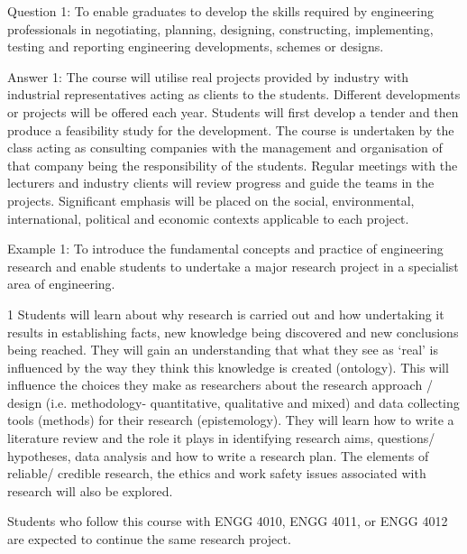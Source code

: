 \begin{question}{Question 1:}
  To enable graduates to develop the skills required by engineering professionals in negotiating, planning, designing, constructing, implementing, testing and reporting engineering developments, schemes or designs.


\end{question}

\begin{answer}{Answer 1:}
The course will utilise real projects provided by industry with industrial representatives acting as clients to the students. Different developments or projects will be offered each year. Students will first develop a tender and then produce a feasibility study for the development. The course is undertaken by the class acting as consulting companies with the management and organisation of that company being the responsibility of the students. Regular meetings with the lecturers and industry clients will review progress and guide the teams in the projects. Significant emphasis will be placed on the social, environmental, international, political and economic contexts applicable to each project.
\end{answer}

\begin{example}{Example 1:}
To introduce the fundamental concepts and practice of engineering research and enable students to undertake a major research project in a specialist area of engineering.
\end{example}

\begin{title1}{1}
  Students will learn about why research is carried out and how undertaking it results in establishing facts, new knowledge being discovered and new conclusions being reached. They will gain an understanding that what they see as ‘real’ is influenced by the way they think this knowledge is created (ontology). This will influence the choices they make as researchers about the research approach / design (i.e. methodology- quantitative, qualitative and mixed) and data collecting tools (methods) for their research (epistemology). They will learn how to write a literature review and the role it plays in identifying research aims, questions/ hypotheses, data analysis and how to write a research plan. The elements of reliable/ credible research, the ethics and work safety issues associated with research will also be explored.

  Students who follow this course with ENGG 4010, ENGG 4011, or ENGG 4012 are expected to continue the same research project.
\end{title1}

